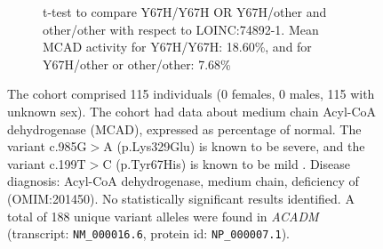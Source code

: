 \begin{figure}[htbp]
    \vspace{2em}
    
    \begin{subfigure}[b]{0.95\textwidth}
    \captionsetup{justification=raggedright,singlelinecheck=false}
    \caption{t-test to compare Y67H/Y67H OR Y67H/other and other/other with respect to LOINC:74892-1. Mean MCAD activity for Y67H/Y67H: 18.60\%, and for Y67H/other or other/other: 7.68\% }
    \end{subfigure}
    
    \vspace{2em}
    
    \caption{The cohort comprised 115 individuals (0 females, 0 males, 115 with unknown sex). The cohort had data about  medium chain Acyl-CoA dehydrogenase (MCAD), expressed as percentage of normal.
    The variant c.985G$>$A (p.Lys329Glu) is known to be severe, and the variant c.199T$>$C (p.Tyr67His) is known to be mild \cite{PMID_33580884}.
    Disease diagnosis: Acyl-CoA dehydrogenase, medium chain, deficiency of (OMIM:201450). No statistically significant results identified. A total of 188 unique variant alleles were found in \textit{ACADM} (transcript: \texttt{NM\_000016.6}, protein id: \texttt{NP\_000007.1}).}
    \end{figure}
    